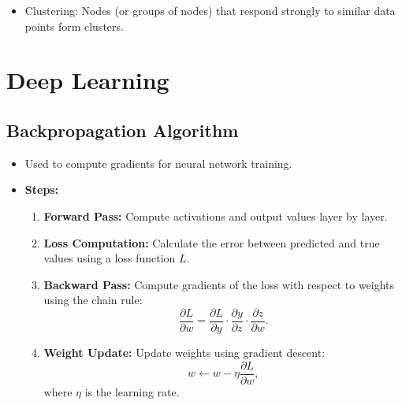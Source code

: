 \documentclass[12pt,a4paper]{article}
\begin{document}
\begin{itemize}
    \item Clustering: Nodes (or groups of nodes) that respond strongly to similar data points form clusters.
\end{itemize}

\pagebreak
\section{Deep Learning}
\subsection{Backpropagation Algorithm}
\begin{itemize}
    \item Used to compute gradients for neural network training.
    \item \textbf{Steps:}
    \begin{enumerate}
        \item \textbf{Forward Pass:} Compute activations and output values layer by layer.
        \item \textbf{Loss Computation:} Calculate the error between predicted and true values using a loss function $L$.
        \item \textbf{Backward Pass:} Compute gradients of the loss with respect to weights using the chain rule:
        \[ \frac{\partial L}{\partial w} = \frac{\partial L}{\partial y} \cdot \frac{\partial y}{\partial z} \cdot \frac{\partial z}{\partial w}. \]
        \item \textbf{Weight Update:} Update weights using gradient descent:
        \[ w \leftarrow w - \eta \frac{\partial L}{\partial w}, \]
        where $\eta$ is the learning rate.
    \end{enumerate}
\end{itemize}
\end{document}
